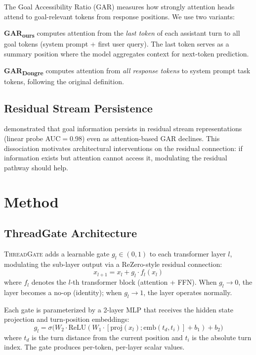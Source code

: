 \documentclass[11pt]{article}
\newcommand{\gar}{\textsc{GAR}}
\newcommand{\garours}{\textsc{GAR}\textsubscript{ours}}
\newcommand{\gardongre}{\textsc{GAR}\textsubscript{Dongre}}
\newcommand{\tg}{\textsc{ThreadGate}}
\begin{document}
The Goal Accessibility Ratio (\gar{}) \citep{dongre2026goal} measures how strongly attention heads attend to goal-relevant tokens from response positions. We use two variants:

\textbf{\garours{}} computes attention from the \emph{last token} of each assistant turn to all goal tokens (system prompt + first user query). The last token serves as a summary position where the model aggregates context for next-token prediction.

\textbf{\gardongre{}} computes attention from \emph{all response tokens} to system prompt task tokens, following the original definition.

\subsection{Residual Stream Persistence}

\citet{dongre2026goal} demonstrated that goal information persists in residual stream representations (linear probe AUC$=$0.98) even as attention-based \gar{} declines. This dissociation motivates architectural interventions on the residual connection: if information exists but attention cannot access it, modulating the residual pathway should help.

\section{Method}

\subsection{ThreadGate Architecture}

\tg{} adds a learnable gate $g_l \in (0,1)$ to each transformer layer $l$, modulating the sub-layer output via a ReZero-style \citep{bachlechner2021rezero} residual connection:
\begin{equation}
    x_{l+1} = x_l + g_l \cdot f_l(x_l)
\end{equation}
where $f_l$ denotes the $l$-th transformer block (attention + FFN). When $g_l \to 0$, the layer becomes a no-op (identity); when $g_l \to 1$, the layer operates normally.

Each gate is parameterized by a 2-layer MLP that receives the hidden state projection and turn-position embeddings:
\begin{equation}
    g_l = \sigma\big(W_2 \cdot \text{ReLU}(W_1 \cdot [\text{proj}(x_l); \text{emb}(t_d, t_i)] + b_1) + b_2\big)
\end{equation}
where $t_d$ is the turn distance from the current position and $t_i$ is the absolute turn index. The gate produces per-token, per-layer scalar values.
\end{document}
